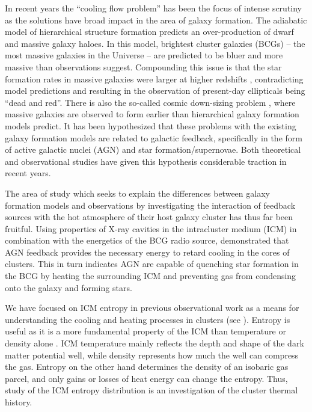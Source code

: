 \documentclass{emulateapj}
\begin{document}
In recent years the ``cooling flow problem'' has been the focus of
intense scrutiny as the solutions have broad impact in the area of
galaxy formation. The adiabatic model of hierarchical structure
formation predicts an over-production of dwarf and massive galaxy
haloes. In this model, brightest cluster galaxies (BCGs) -- the most
massive galaxies in the Universe -- are predicted to be bluer and more
massive than observations suggest. Compounding this issue is that the
star formation rates in massive galaxies were larger at higher
redshifts \citep{1996AJ....112..839C, 2005ApJ...619L.135J},
contradicting model predictions and resulting in the observation of
present-day ellipticals being ``dead and red''. There is also the
so-called cosmic down-sizing problem \citep{1996AJ....112..839C},
where massive galaxies are observed to form earlier than hierarchical
galaxy formation models predict. It has been hypothesized that these
problems with the existing galaxy formation models are related to
galactic feedback, specifically in the form of active galactic nuclei
(AGN) and star formation/supernovae. Both theoretical \citep{bower06,
  croton06} and observational \citep{peterson2003, mcnamrev} studies
have given this hypothesis considerable traction in recent years.

The area of study which seeks to explain the differences between
galaxy formation models and observations by investigating the
interaction of feedback sources with the hot atmosphere of their host
galaxy cluster has thus far been fruitful. Using properties of X-ray
cavities in the intracluster medium (ICM) in combination with the
energetics of the BCG radio source, \cite{birzan04} demonstrated that
AGN feedback provides the necessary energy to retard cooling in the
cores of clusters. This in turn indicates AGN are capable of quenching
star formation in the BCG by heating the surrounding ICM and preventing
gas from condensing onto the galaxy and forming stars.

We have focused on ICM entropy in previous observational work as a
means for understanding the cooling and heating processes in clusters
(see \citealt{radioquiet, d06, accept}). Entropy is useful as it is a
more fundamental property of the ICM than temperature or density alone
\citep{voitbryan,voitreview}. ICM temperature mainly reflects the
depth and shape of the dark matter potential well, while density
represents how much the well can compress the gas. Entropy on the
other hand determines the density of an isobaric gas parcel, and only
gains or losses of heat energy can change the entropy. Thus, study of
the ICM entropy distribution is an investigation of the cluster
thermal history.
\end{document}
